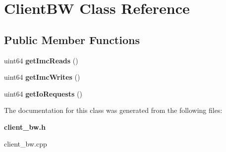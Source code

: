 \section{Client\+BW Class Reference}
\label{classClientBW}
\subsection*{Public Member Functions}
\begin{DoxyCompactItemize}
\item 
\mbox{\label{classClientBW_adfd4220c06e62c3c3afe94d8388bcfe7}} 
uint64 {\bfseries get\+Imc\+Reads} ()
\item 
\mbox{\label{classClientBW_ad6ff206335be757c9de8fb732e66d2da}} 
uint64 {\bfseries get\+Imc\+Writes} ()
\item 
\mbox{\label{classClientBW_acf0f1555e987641be5196312b89eb12b}} 
uint64 {\bfseries get\+Io\+Requests} ()
\end{DoxyCompactItemize}


The documentation for this class was generated from the following files\+:\begin{DoxyCompactItemize}
\item 
\textbf{ client\+\_\+bw.\+h}\item 
client\+\_\+bw.\+cpp\end{DoxyCompactItemize}
